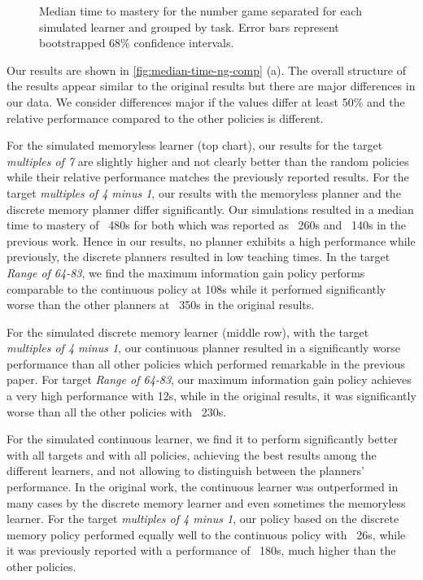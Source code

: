 \begin{figure}
    \caption{Median time to mastery for the number game separated for each simulated learner and grouped by task. 
    Error bars represent bootstrapped 68\% confidence intervals. 
    }
    \label{fig:median-time-ng-comp}
\end{figure}


Our results are shown in \autoref{fig:median-time-ng-comp} (a). 
The overall structure of the results appear similar to the original results but there are major differences in our data.
We consider differences major if the values differ at least 50\% and the relative performance compared to the other policies is different.

For the simulated memoryless learner (top chart), our results for the target \textit{multiples of 7} are slightly higher and not clearly better than the random policies while their relative performance matches the previously reported results.
For the target \textit{multiples of 4 minus 1}, our results with the memoryless planner and the discrete memory planner differ significantly. 
Our simulations resulted in a median time to mastery of ~480s for both which was reported as ~260s and ~140s in the previous work. 
Hence in our results, no planner exhibits a high performance while previously, the discrete planners resulted in low teaching times.
In the target \textit{Range of 64-83}, we find the maximum information gain policy performs comparable to the continuous policy at 108s while it performed significantly worse than the other planners at ~350s in the original results.

For the simulated discrete memory learner (middle row), with the target \textit{multiples of 4 minus 1}, our continuous planner resulted in a significantly worse performance than all other policies which performed remarkable in the previous paper.
For target \textit{Range of 64-83}, our maximum information gain policy achieves a very high performance with 12s, while in the original results, it was significantly worse than all the other policies with ~230s.

For the simulated continuous learner, we find it to perform significantly better with all targets and with all policies, achieving the best results among the different learners, and not allowing to distinguish between the planners' performance. 
In the original work, the continuous learner was outperformed in many cases by the discrete memory learner and even sometimes the memoryless learner.
For the target \textit{multiples of 4 minus 1}, our policy based on the discrete memory policy performed equally well to the continuous policy with ~26s, while it was previously reported with a performance of ~180s, much higher than the other policies.

